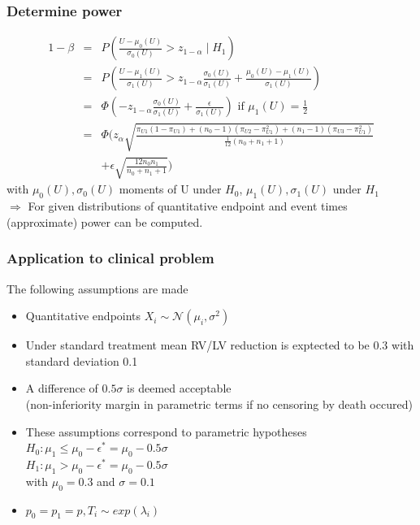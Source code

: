 \documentclass[xcolor=pdftex,dvipsnames,table]{beamer}\usepackage[]{graphicx}\usepackage[]{color}
\begin{document}
\begin{frame} %
\frametitle{Determine power}
\begin{eqnarray*}
  1 - \beta & = & P(\frac{U - \mu_0(U)}{\sigma_0(U)}  > z_{1-\alpha} \mid H_1) \\
            & = & P \left(\frac{U - \mu_1(U)}{\sigma_1(U)}  > z_{1-\alpha}\frac{\sigma_0(U)}{\sigma_1(U)} + 
                    \frac{\mu_0(U) - \mu_1(U)}{\sigma_1(U)} \right) \\
            & = & \Phi\left(- z_{1-\alpha}\frac{\sigma_0(U)}{\sigma_1(U)} + \frac{\epsilon}{\sigma_1(U)}\right) \mbox{ if } \mu_1(U) = \frac{1}{2}\\
            & = & \Phi\bigg(z_{\alpha} \textstyle \sqrt{\frac{\pi_{U1} (1 - \pi_{U1}) + (n_0 - 1) (\pi_{U2} - \pi_{U1}^2) + (n_1 - 1) (\pi_{U3} - \pi_{U1}^2)}{\frac{1}{12}(n_0 + n_1 + 1)}}  \\
            &   & + \epsilon \textstyle \sqrt{\frac{12 n_0 n_1}{n_0 + n_1 + 1}}
            \bigg)
\end{eqnarray*}
with $\mu_0(U), \sigma_0(U)$ moments of U under $H_0$, $\mu_1(U), \sigma_1(U)$ under $H_1$\\
$\Rightarrow$ 
For given distributions of quantitative endpoint and event times (approximate) power can be computed.
\end{frame}

\begin{frame} %
\frametitle{Application to clinical problem}
The following assumptions are made
\begin{itemize}
  \item Quantitative endpoints $X_i \sim \mathcal{N} ( \mu_i, \sigma^2 ) $
  \item Under standard treatment mean RV/LV reduction is exptected to be 0.3 with standard deviation 0.1
  \item A difference of $0.5 \sigma$ is deemed acceptable \\
        (non-inferiority margin in parametric terms if no censoring by death occured)
  \item These assumptions correspond to parametric hypotheses \\
        $H_0: \mu_1 \leq \mu_0 - \epsilon^{*}  = \mu_0 - 0.5 \sigma $\\
        $H_1: \mu_1 > \mu_0 - \epsilon^{*} = \mu_0 - 0.5 \sigma $ \\
        with $\mu_0 = 0.3$ and $\sigma = 0.1$
  \item $p_0 = p_1 = p, T_i \sim exp(\lambda_i)$
\end{itemize}
\end{frame}
\end{document}
